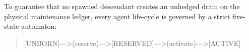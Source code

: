 \documentclass[
]{article}
\begin{document}
To guarantee that no spawned descendant creates an unhedged drain on the
physical maintenance ledger, every agent life-cycle is governed by a
strict five-state automaton:

\begin{quote}\small\ttfamily\raggedright\setlength{\parskip}{0pt}
\noindent \hspace*{0.525em}\allowbreak{}\hspace*{0.525em}\allowbreak{}[\allowbreak{}U\allowbreak{}N\allowbreak{}B\allowbreak{}O\allowbreak{}R\allowbreak{}N\allowbreak{}]\allowbreak{}\hspace*{0.525em}\allowbreak{}-\allowbreak{}-\allowbreak{}-\allowbreak{}>\allowbreak{}\hspace*{0.525em}\allowbreak{}(\allowbreak{}r\allowbreak{}e\allowbreak{}s\allowbreak{}e\allowbreak{}r\allowbreak{}v\allowbreak{}e\allowbreak{})\allowbreak{}\hspace*{0.525em}\allowbreak{}-\allowbreak{}-\allowbreak{}-\allowbreak{}>\allowbreak{}\hspace*{0.525em}\allowbreak{}[\allowbreak{}R\allowbreak{}E\allowbreak{}S\allowbreak{}E\allowbreak{}R\allowbreak{}V\allowbreak{}E\allowbreak{}D\allowbreak{}]\allowbreak{}\hspace*{0.525em}\allowbreak{}-\allowbreak{}-\allowbreak{}-\allowbreak{}>\allowbreak{}\hspace*{0.525em}\allowbreak{}(\allowbreak{}a\allowbreak{}c\allowbreak{}t\allowbreak{}i\allowbreak{}v\allowbreak{}a\allowbreak{}t\allowbreak{}e\allowbreak{})\allowbreak{}\hspace*{0.525em}\allowbreak{}-\allowbreak{}-\allowbreak{}-\allowbreak{}>\allowbreak{}\hspace*{0.525em}\allowbreak{}[\allowbreak{}A\allowbreak{}C\allowbreak{}T\allowbreak{}I\allowbreak{}V\allowbreak{}E\allowbreak{}]\par

\end{quote}
\end{document}
